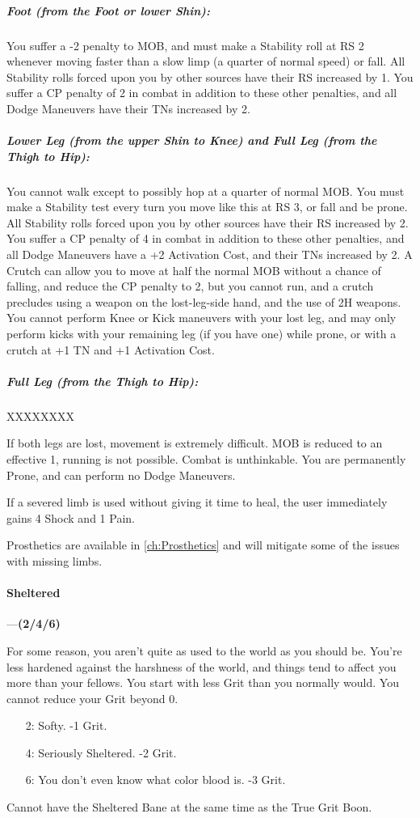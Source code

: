 \documentclass[oneside,11pt,english]{book}
\begin{document}
\vspace*{-10pt}\subparagraph*{Foot (from the Foot or lower Shin):}
You suffer a -2 penalty to MOB, and must make a Stability roll at RS 2 whenever moving faster 
than a slow limp (a quarter of normal speed) or fall. All Stability rolls forced upon you by other 
sources have their RS increased by 1. You suffer a CP penalty of 2 in combat in addition to these 
other penalties, and all Dodge Maneuvers have their TNs increased by 2. 
\vspace*{-10pt}\subparagraph*{Lower Leg (from the upper Shin to Knee) and Full Leg (from the Thigh to Hip):}
You cannot walk except to possibly hop at a quarter of normal MOB. You must make a Stability 
test every turn you move like this at RS 3, or fall and be prone. All Stability rolls forced upon you 
by other sources have their RS increased by 2. You suffer a CP penalty of 4 in combat in addition 
to these other penalties, and all Dodge Maneuvers have a +2 Activation Cost, and their TNs 
increased by 2. A Crutch can allow you to move at half the normal MOB without a chance of 
falling, and reduce the CP penalty to 2, but you cannot run, and a crutch precludes using a 
weapon on the lost-leg-side hand, and the use of 2H weapons. You cannot perform Knee or Kick 
maneuvers with your lost leg, and may only perform kicks with your remaining leg (if you have 
one) while prone, or with a crutch at +1 TN and +1 Activation Cost. 
\vspace*{-10pt}\subparagraph*{Full Leg (from the Thigh to Hip):}
XXXXXXXX

If both legs are lost, movement is extremely difficult. MOB is reduced to an effective 1, running 
is not possible. Combat is unthinkable. You are permanently Prone, and can perform no Dodge 
Maneuvers. 


If a severed limb is used without giving it time to heal, the user immediately gains 4 Shock and 1 Pain.


Prosthetics are available in \autoref{ch:Prosthetics} and will mitigate some of the issues with missing limbs.
\paragraph{\label{bane:Sheltered}Sheltered}---\quad\textbf{(2/4/6) }\par
For some reason, you aren’t quite as used to the world as you should be. You’re less hardened against the 
harshness of the world, and things tend to affect you more than your fellows. You start with less Grit than 
you normally would. You cannot reduce your Grit beyond 0. 
\begin{itemize}
\item [2:] Softy. -1 Grit.
\item [4:] Seriously Sheltered. -2 Grit.
\item [6:]You don’t even know what color blood is. -3 Grit.
\end{itemize}
Cannot have the Sheltered Bane at the same time as the True Grit Boon. 
\end{document}
